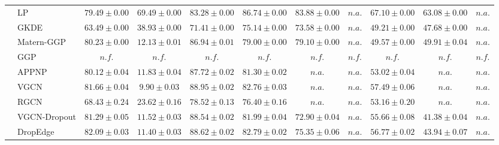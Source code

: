 \begin{table*}[!h]
{\begin{tabular}{ll|cc|cccc|ccc}
        & LP & ${79.49\scriptscriptstyle \pm 0.00}$ & ${69.49\scriptscriptstyle \pm 0.00}$ & ${83.28\scriptscriptstyle \pm 0.00}$ & ${{86.74}\scriptscriptstyle \pm 0.00}$ & ${83.88\scriptscriptstyle \pm 0.00}$ & $n.a.$ & ${{67.10}\scriptscriptstyle \pm 0.00}$ & ${63.08\scriptscriptstyle \pm 0.00}$ & $n.a.$\\
        & GKDE & ${63.49\scriptscriptstyle \pm 0.00}$ & ${38.93\scriptscriptstyle \pm 0.00}$ & ${71.41\scriptscriptstyle \pm 0.00}$ & ${75.14\scriptscriptstyle \pm 0.00}$ & ${73.58\scriptscriptstyle \pm 0.00}$ & $n.a.$ & ${49.21\scriptscriptstyle \pm 0.00}$ & ${47.68\scriptscriptstyle \pm 0.00}$ & $n.a.$\\
        & Matern-GGP & ${80.23\scriptscriptstyle \pm 0.00}$ & ${12.13\scriptscriptstyle \pm 0.01}$ & ${86.94\scriptscriptstyle \pm 0.01}$ & ${79.00\scriptscriptstyle \pm 0.00}$ & ${79.10\scriptscriptstyle \pm 0.00}$ & $n.a.$ & ${49.57\scriptscriptstyle \pm 0.00}$ & ${49.91\scriptscriptstyle \pm 0.04}$ & $n.a.$\\
        & GGP & $n.f.$ & $n.f.$ & $n.f.$ & $n.f.$ & $n.f.$ & $n.f.$ & $n.f.$ & $n.f.$ & $n.f.$\\
        & APPNP & ${80.12\scriptscriptstyle \pm 0.04}$ & ${11.83\scriptscriptstyle \pm 0.04}$ & ${87.72\scriptscriptstyle \pm 0.02}$ & ${81.30\scriptscriptstyle \pm 0.02}$ & $n.a.$ & $n.a.$ & ${53.02\scriptscriptstyle \pm 0.04}$ & $n.a.$ & $n.a.$\\
        & VGCN & ${81.66\scriptscriptstyle \pm 0.04}$ & ${9.90\scriptscriptstyle \pm 0.03}$ & ${88.95\scriptscriptstyle \pm 0.02}$ & ${82.76\scriptscriptstyle \pm 0.03}$ & $n.a.$ & $n.a.$ & ${57.49\scriptscriptstyle \pm 0.06}$ & $n.a.$ & $n.a.$\\
        & RGCN & ${68.43\scriptscriptstyle \pm 0.24}$ & ${23.62\scriptscriptstyle \pm 0.16}$ & ${78.52\scriptscriptstyle \pm 0.13}$ & ${76.40\scriptscriptstyle \pm 0.16}$ & $n.a.$ & $n.a.$ & ${53.16\scriptscriptstyle \pm 0.20}$ & $n.a.$ & $n.a.$\\
        & VGCN-Dropout & ${81.29\scriptscriptstyle \pm 0.05}$ & ${11.52\scriptscriptstyle \pm 0.03}$ & ${88.54\scriptscriptstyle \pm 0.02}$ & ${81.99\scriptscriptstyle \pm 0.04}$ & ${72.90\scriptscriptstyle \pm 0.04}$ & $n.a.$ & ${55.66\scriptscriptstyle \pm 0.08}$ & ${41.38\scriptscriptstyle \pm 0.04}$ & $n.a.$\\
        & DropEdge & ${82.09\scriptscriptstyle \pm 0.03}$ & ${11.40\scriptscriptstyle \pm 0.03}$ & ${88.62\scriptscriptstyle \pm 0.02}$ & ${82.79\scriptscriptstyle \pm 0.02}$ & ${75.35\scriptscriptstyle \pm 0.06}$ & $n.a.$ & ${56.77\scriptscriptstyle \pm 0.02}$ & ${43.94\scriptscriptstyle \pm 0.07}$ & $n.a.$\\

\end{tabular}}
\end{table*}
